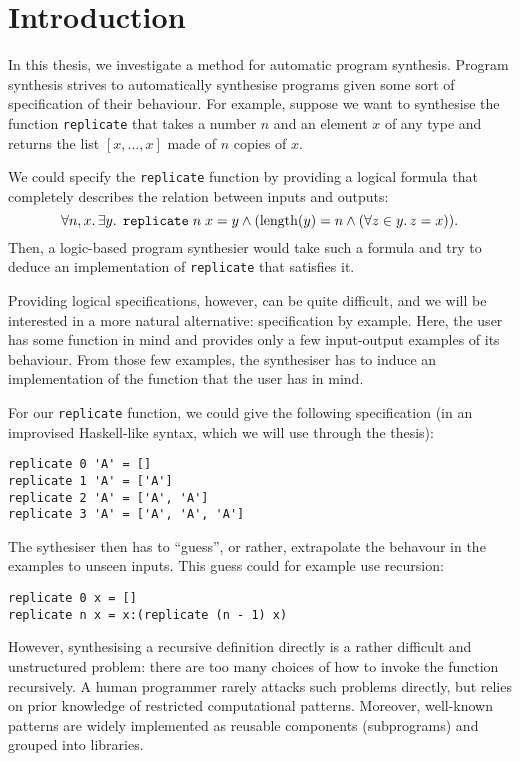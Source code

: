 \lstset{style=plain}

\chapter{Introduction}\label{ch:introduction}
In this thesis, we investigate a method for automatic program synthesis.  Program synthesis strives to automatically synthesise programs given some sort of specification of their behaviour.   For example, suppose we want to synthesise the function \lstinline!replicate! that takes a number $n$ and an element $x$ of any type and returns the list $[x, \dots, x]$ made of $n$ copies of $x$.

We could specify the \lstinline!replicate! function by providing a logical formula that completely describes the relation between inputs and outputs: \[ \forall n, x \ldotp \exists y \ldotp \; \texttt{replicate} \; n \; x = y \land (\mathrm{length}(y) = n \land (\forall z \in y \ldotp z = x)). \]  Then, a logic-based program synthesier would take such a formula and try to deduce an implementation of \lstinline!replicate! that satisfies it.

Providing logical specifications, however, can be quite difficult, and we will be interested in a more natural alternative: specification by example.  Here, the user has some function in mind and provides only a few input-output examples of its behaviour.  From those few examples, the synthesiser has to induce an implementation of the function that the user has in mind.

For our \lstinline!replicate! function, we could give the following specification (in an improvised Haskell-like syntax, which we will use through the thesis):
\begin{lstlisting}[style=plain]
replicate 0 'A' = []
replicate 1 'A' = ['A']
replicate 2 'A' = ['A', 'A']
replicate 3 'A' = ['A', 'A', 'A']
\end{lstlisting}
The sythesiser then has to ``guess'', or rather, extrapolate the behavour in the examples to unseen inputs.  This guess could for example use recursion:
\begin{lstlisting}[style=plain]
replicate 0 x = []
replicate n x = x:(replicate (n - 1) x)
\end{lstlisting}

However, synthesising a recursive definition directly is a rather difficult and unstructured problem: there are too many choices of how to invoke the function recursively.  A human programmer rarely attacks such problems directly, but relies on prior knowledge of restricted computational patterns.  Moreover, well-known patterns are widely implemented as reusable components (subprograms) and grouped into libraries.

